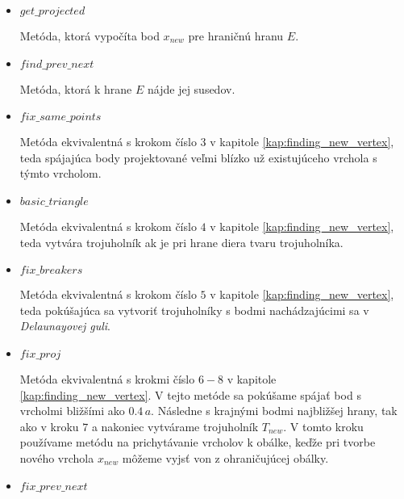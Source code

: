 \begin{itemize}
{\begin{itemize}
{                Metóda, v ktorej sa v správnom poradí volajú ďalšie metódy tak ako boli opísané v 
                kapitole \ref{kap:finding_new_vertex}.
                Ak sa nám v žiadnej z týchto metód neporadí nájsť nový trojuholník na konci kroku 
                označíme hranu $E = (x_i, x_j)$ za skontrolovanú.
            }
            \item{
                $get\_projected$

                Metóda, ktorá vypočíta bod $x_{new}$ pre hraničnú hranu $E$.
            }
            \item{
                $find\_prev\_next$

                Metóda, ktorá k hrane $E$ nájde jej susedov. 
            }
            \item{
                $fix\_same\_points$

                Metóda ekvivalentná s krokom číslo $3$ v kapitole \ref{kap:finding_new_vertex}, 
                teda spájajúca body projektované veľmi blízko už existujúceho vrchola s týmto vrcholom.
            }
            \item{
                $basic\_triangle$

                Metóda ekvivalentná s krokom číslo $4$ v kapitole \ref{kap:finding_new_vertex},
                teda vytvára trojuholník ak je pri hrane diera tvaru trojuholníka.
            }
            \item{
                $fix\_breakers$

                Metóda ekvivalentná s krokom číslo $5$ v kapitole \ref{kap:finding_new_vertex},
                teda pokúšajúca sa vytvoriť trojuholníky s bodmi nachádzajúcimi sa v 
                \textit{Delaunayovej guli}.
            }
            \item{
                $fix\_proj$

                Metóda ekvivalentná s krokmi číslo $6-8$ v kapitole \ref{kap:finding_new_vertex}.
                V tejto metóde sa pokúšame spájať bod s vrcholmi bližšími ako $0.4 \, a$. Následne 
                s krajnými bodmi najbližšej hrany, tak ako v kroku $7$ a nakoniec vytvárame 
                trojuholník $T_{new}$. V tomto kroku používame metódu na prichytávanie vrcholov
                k obálke, keďže pri tvorbe nového vrchola $x_{new}$ môžeme vyjsť von z 
                ohraničujúcej obálky.
            }
            \item{
                $fix\_prev\_next$

}
\end{itemize}}
\end{itemize}
